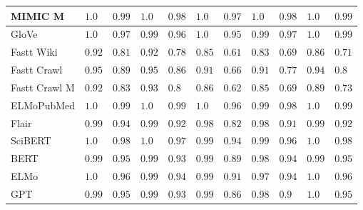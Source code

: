 \documentclass[letterpaper]{article} %
\begin{document}
\begin{table}[h]
\begin{tabular}{l l l l l l l l l l l}
MIMIC M & $1.0$ & $0.99$ & $1.0$ & $0.98$ & $1.0$ & $0.97$ & $1.0$ & $0.98$ & $1.0$ & $0.99$ \\
\midrule
GloVe & $1.0$ & $0.97$ & $0.99$ & $0.96$ & $1.0$ & $0.95$ & $0.99$ & $0.97$ & $1.0$ & $0.99$ \\
Fastt Wiki & $0.92$ & $0.81$ & $0.92$ & $0.78$ & $0.85$ & $0.61$ & $0.83$ & $0.69$ & $0.86$ & $0.71$ \\
Fastt Crawl & $0.95$ & $0.89$ & $0.95$ & $0.86$ & $0.91$ & $0.66$ & $0.91$ & $0.77$ & $0.94$ & $0.8$ \\
Fastt Crawl M & $0.92$ & $0.83$ & $0.93$ & $0.8$ & $0.86$ & $0.62$ & $0.85$ & $0.69$ & $0.89$ & $0.73$ \\
\midrule
ELMoPubMed & $1.0$ & $0.99$ & $1.0$ & $0.99$ & $1.0$ & $0.96$ & $0.99$ & $0.98$ & $1.0$ & $0.99$ \\
Flair & $0.99$ & $0.94$ & $0.99$ & $0.92$ & $0.98$ & $0.82$ & $0.98$ & $0.91$ & $0.99$ & $0.92$ \\
SciBERT & $1.0$ & $0.98$ & $1.0$ & $0.97$ & $0.99$ & $0.94$ & $0.99$ & $0.96$ & $1.0$ & $0.98$ \\
BERT & $0.99$ & $0.95$ & $0.99$ & $0.93$ & $0.99$ & $0.89$ & $0.98$ & $0.94$ & $0.99$ & $0.95$ \\
ELMo & $1.0$ & $0.96$ & $0.99$ & $0.94$ & $0.99$ & $0.91$ & $0.97$ & $0.94$ & $1.0$ & $0.96$ \\
GPT & $0.99$ & $0.95$ & $0.99$ & $0.93$ & $0.99$ & $0.86$ & $0.98$ & $0.9$ & $1.0$ & $0.95$ \\


\end{tabular}
\end{table}
\end{document}
